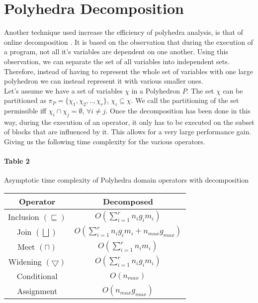  \section{Polyhedra Decomposition}
Another technique used increase the efficiency of polyhedra analysis, is that of online decomposition \cite{singh2017fast}. It is based on the observation that during the execution of a program, not all it's variables are dependent on one another. Using this observation, we can separate the set of all variables into independent sets. Therefore, instead of having to represent the whole set of variables with one large polyhedron we can instead represent it with various smaller ones.\\ Let's assume we have a set of variables $\chi$ in a Polyhedron $P$. The set $\chi$ can be partitioned as $\pi_P=\{ \chi_1,\chi_2,..,\chi_r\}$, $\chi_i\subseteq\chi $. We call the partitioning of the set permissible iff $ \chi_i \cap \chi_j = \emptyset$, $ \forall i \neq j$. Once the decomposition has been done in this way, during the execution of an operator, it only has to be executed on the subset of blocks that are influenced by it. This allows for a very large performance gain. Giving us the following time complexity for the various operators.

\paragraph{Table 2} Asymptotic time complexity of Polyhedra domain operators with decomposition

\begin{center}
\begin{tabular}{||c c||} 
 
 \hline
 Operator & Decomposed  \\ [0.5ex] 
 \hline
 Inclusion $(\sqsubseteq)$ & $O(\sum_{i=1}^r n_ig_im_i)$\\ 
 \hline
 Join $(\bigsqcup)$ & $O(\sum_{i=1}^r n_i g_i m_i + n_{max} g_{max})$ \\
 \hline
 Meet $(\sqcap)$ & $O(\sum_{i=1}^r n_i m_i)$ \\
 \hline
 Widening $(\bigtriangledown)$ & $O(\sum_{i=1}^r n_i g_i m_i)$\\
 \hline
 Conditional & $O(n_{max})$ \\ 
 \hline
 Assignment & $O(n_{max}g_{max})$ \\ 
 
 
 \hline
\end{tabular}
\end{center}

